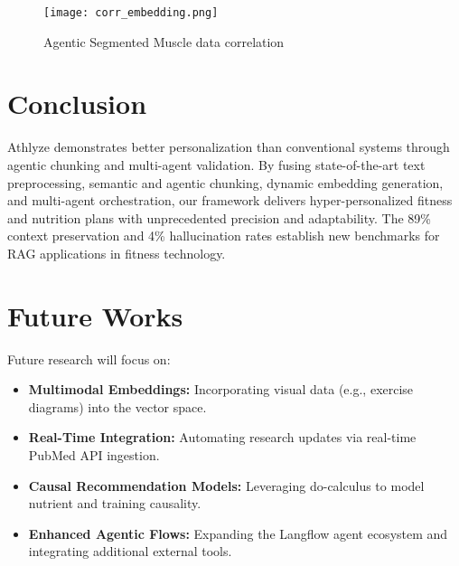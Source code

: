 \documentclass[conference]{IEEEtran}
\begin{document}
\begin{figure}[h!]
    \centering
    \texttt{[image: corr\_embedding.png]}
    \caption{Agentic Segmented Muscle data correlation}
    \label{fig:RAG}
\end{figure}

\section{Conclusion}
Athlyze demonstrates better personalization than conventional systems through agentic chunking and multi-agent validation. By fusing state-of-the-art text preprocessing, semantic and agentic chunking, dynamic embedding generation, and multi-agent orchestration, our framework delivers hyper-personalized fitness and nutrition plans with unprecedented precision and adaptability. The 89\% context preservation and 4\% hallucination rates establish new benchmarks for RAG applications in fitness technology.

\section{Future Works}
Future research will focus on:
\begin{itemize}
    \item \textbf{Multimodal Embeddings:} Incorporating visual data (e.g., exercise diagrams) into the vector space.
    \item \textbf{Real-Time Integration:} Automating research updates via real-time PubMed API ingestion.
    \item \textbf{Causal Recommendation Models:} Leveraging do-calculus to model nutrient and training causality.
    \item \textbf{Enhanced Agentic Flows:} Expanding the Langflow agent ecosystem and integrating additional external tools.\\
\end{itemize}
\end{document}
